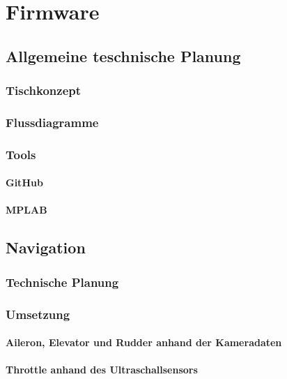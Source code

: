\chapter{Firmware}
\renewcommand{\kapitelautor}{Autor: Lucas Ullrich}

\section{Allgemeine teschnische Planung}

  \subsection{Tischkonzept}

  \subsection{Flussdiagramme}

  \subsection{Tools}
    \subsubsection{GitHub}

    \subsubsection{MPLAB}

\section{Navigation}

  \subsection{Technische Planung}

  \subsection{Umsetzung}
    \subsubsection{Aileron, Elevator und Rudder anhand der Kameradaten}

    \subsubsection{Throttle anhand des Ultraschallsensors}


